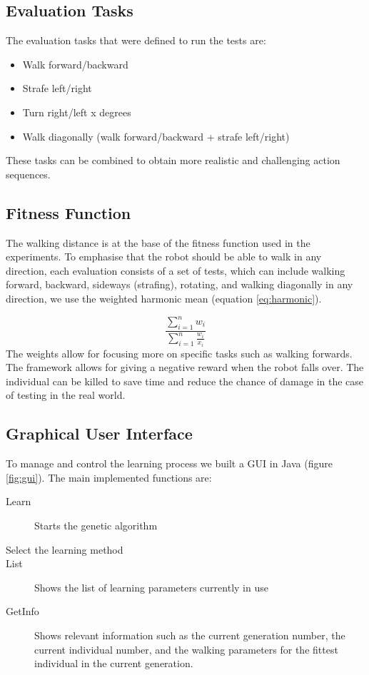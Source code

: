 \documentclass{article}
\begin{document}
\subsection{Evaluation Tasks}

The evaluation tasks that were defined to run the tests are:

\begin{itemize}
\item Walk forward/backward 
\item Strafe left/right 
\item Turn right/left x degrees 
\item Walk diagonally (walk forward/backward + strafe left/right) 

\end{itemize}

These tasks can be combined to obtain more realistic and challenging action sequences.

\subsection{Fitness Function}

The walking distance is at the base of the fitness function used in the 
experiments. To emphasise that the robot should be able to walk in any 
direction, each evaluation consists of a set of tests, which can include
walking forward, backward, sideways (strafing), rotating, and walking
diagonally in any direction, we use the weighted harmonic mean (equation
\ref{eq:harmonic}).

\begin{equation}
	\frac{\sum^{n}_{i=1} w_i} {\sum^{n}_{i=1}\frac{w_i}{x_i}}
    \label{eq:harmonic}
\end{equation}
The weights allow for focusing more on specific tasks such as walking forwards.
The framework allows for giving a negative reward when the robot falls over.
The individual can be killed to save time and reduce the chance of damage in
the case of testing in the real world.

\subsection{Graphical User Interface}
To manage and control the learning process we built a GUI in Java (figure \ref{fig:gui}). 
The main implemented functions are:

\begin{description}
\item[Learn] Starts the genetic algorithm
\item[Select the learning method]
\item[List] Shows the list of learning parameters currently in use
\item[GetInfo] Shows relevant information such as the current generation number, the current individual number, and the walking parameters for the fittest individual in the current generation.
\end{description}
\end{document}
